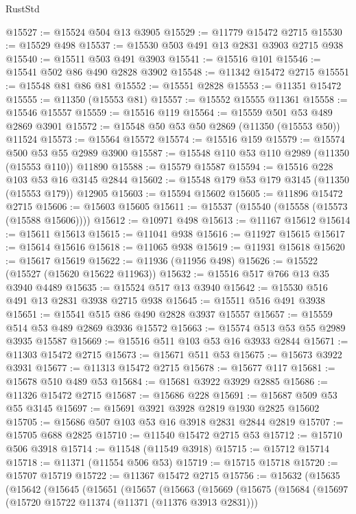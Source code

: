 \begin{lexlean}{RustStd}
\begin{coremodule}
@15527 := @15524 @504 @13 @3905
@15529 := @11779 @15472 @2715
@15530 := @15529 @498
@15537 := @15530 @503 @491 @13 @2831 @3903 @2715 @938
@15540 := @15511 @503 @491 @3903
@15541 := @15516 @101
@15546 := @15541 @502 @86 @490 @2828 @3902
@15548 := @11342 @15472 @2715
@15551 := @15548 @81 @86 @81
@15552 := @15551 @2828
@15553 := @11351 @15472
@15555 := @11350 (@15553 @81)
@15557 := @15552 @15555 @11361
@15558 := @15546 @15557
@15559 := @15516 @119
@15564 := @15559 @501 @53 @489 @2869 @3901
@15572 := @15548 @50 @53 @50 @2869 (@11350 (@15553 @50)) @11524
@15573 := @15564 @15572
@15574 := @15516 @159
@15579 := @15574 @500 @53 @55 @2989 @3900
@15587 := @15548 @110 @53 @110 @2989 (@11350 (@15553 @110)) @11890
@15588 := @15579 @15587
@15594 := @15516 @228 @103 @53 @16 @3145 @2844
@15602 := @15548 @179 @53 @179 @3145 (@11350 (@15553 @179)) @12905
@15603 := @15594 @15602
@15605 := @11896 @15472 @2715
@15606 := @15603 @15605
@15611 := @15537 (@15540 (@15558 (@15573 (@15588 @15606))))
@15612 := @10971 @498
@15613 := @11167 @15612
@15614 := @15611 @15613
@15615 := @11041 @938
@15616 := @11927 @15615
@15617 := @15614 @15616
@15618 := @11065 @938
@15619 := @11931 @15618
@15620 := @15617 @15619
@15622 := @11936 (@11956 @498)
@15626 := @15522 (@15527 (@15620 @15622 @11963))
@15632 := @15516 @517 @766 @13 @35 @3940 @4489
@15635 := @15524 @517 @13 @3940
@15642 := @15530 @516 @491 @13 @2831 @3938 @2715 @938
@15645 := @15511 @516 @491 @3938
@15651 := @15541 @515 @86 @490 @2828 @3937 @15557
@15657 := @15559 @514 @53 @489 @2869 @3936 @15572
@15663 := @15574 @513 @53 @55 @2989 @3935 @15587
@15669 := @15516 @511 @103 @53 @16 @3933 @2844
@15671 := @11303 @15472 @2715
@15673 := @15671 @511 @53
@15675 := @15673 @3922 @3931
@15677 := @11313 @15472 @2715
@15678 := @15677 @117
@15681 := @15678 @510 @489 @53
@15684 := @15681 @3922 @3929 @2885
@15686 := @11326 @15472 @2715
@15687 := @15686 @228
@15691 := @15687 @509 @53 @55 @3145
@15697 := @15691 @3921 @3928 @2819 @1930 @2825 @15602
@15705 := @15686 @507 @103 @53 @16 @3918 @2831 @2844 @2819
@15707 := @15705 @688 @2825
@15710 := @11540 @15472 @2715 @53
@15712 := @15710 @506 @3918
@15714 := @11548 (@11549 @3918)
@15715 := @15712 @15714
@15718 := @11371 (@11554 @506 @53)
@15719 := @15715 @15718
@15720 := @15707 @15719
@15722 := @11367 @15472 @2715
@15756 := @15632
    (@15635
      (@15642
        (@15645
          (@15651
            (@15657
              (@15663
                (@15669
                  (@15675
                    (@15684
                      (@15697
                        (@15720 @15722 @11374 (@11371 (@11376 @3913 @2831)))

\end{coremodule}
\end{lexlean}
